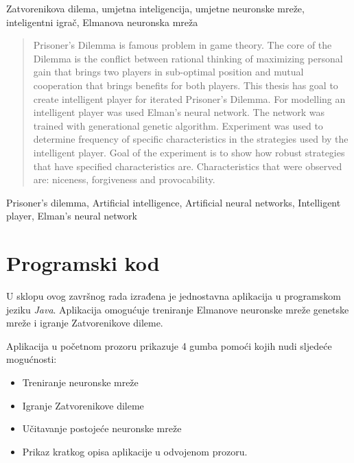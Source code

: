 \documentclass[zavrsnirad]{fer}
\begin{document}
\begin{kljucnerijeci}
	Zatvorenikova dilema, umjetna inteligencija, umjetne neuronske mreže, inteligentni igrač, Elmanova neuronska mreža
\end{kljucnerijeci}


\begin{abstract}
	
	Prisoner's Dilemma is famous problem in game theory. The core of the Dilemma is the conflict between rational thinking of maximizing personal gain that brings two players in sub-optimal position and mutual cooperation that brings benefits for both players. This thesis has goal to create intelligent player for iterated Prisoner's Dilemma. For modelling an intelligent player was used Elman's neural network. The network was trained with generational genetic algorithm. Experiment was used to determine frequency of specific characteristics in the strategies used by the intelligent player. Goal of the experiment is to show how robust strategies that have specified characteristics are. Characteristics that were observed are: niceness, forgiveness and provocability.
	
\end{abstract}

\begin{keywords}
  Prisoner's dilemma, Artificial intelligence, Artificial neural networks, Intelligent player, Elman's neural network
\end{keywords}



\backmatter

\chapter{Programski kod}

	U sklopu ovog završnog rada izrađena je jednostavna aplikacija u programskom jeziku \textit{Java}. Aplikacija omogućuje treniranje Elmanove neuronske mreže genetske mreže i igranje Zatvorenikove dileme.
	
	Aplikacija u početnom prozoru prikazuje 4 gumba pomoći kojih nudi sljedeće mogućnosti:
	\begin{itemize}
		\item Treniranje neuronske mreže
		\item Igranje Zatvorenikove dileme
		\item Učitavanje postojeće neuronske mreže
		\item Prikaz kratkog opisa aplikacije u odvojenom prozoru.
	\end{itemize}
	
\end{document}
